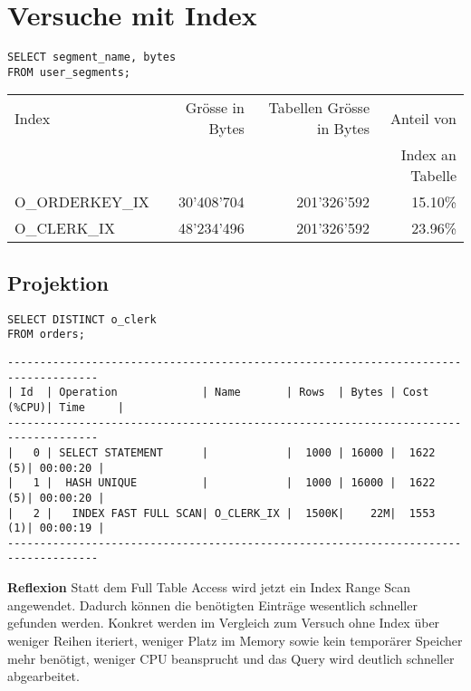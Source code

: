 \documentclass[10pt]{article}
\begin{document}
\section{Versuche mit Index}
\begin{lstlisting}[style=sql]
SELECT segment_name, bytes
FROM user_segments;
\end{lstlisting}


\begin{tabular}{l||r|r|r}
  Index & Grösse in Bytes & Tabellen Grösse in Bytes & Anteil von \\ 
  & & &  Index an Tabelle \\ \hline
  \hline
  O\_ORDERKEY\_IX & 30'408'704 & 201'326'592 & 15.10\%  \\ \hline
  O\_CLERK\_IX & 48'234'496 & 201'326'592 & 23.96\% \\ 
\end{tabular}

\subsection{Projektion}
\begin{lstlisting}[style=sql]
SELECT DISTINCT o_clerk
FROM orders;
\end{lstlisting}
\begin{lstlisting}[style=queryexecutionplan]
------------------------------------------------------------------------------------
| Id  | Operation             | Name       | Rows  | Bytes | Cost (%CPU)| Time     |
------------------------------------------------------------------------------------
|   0 | SELECT STATEMENT      |            |  1000 | 16000 |  1622   (5)| 00:00:20 |
|   1 |  HASH UNIQUE          |            |  1000 | 16000 |  1622   (5)| 00:00:20 |
|   2 |   INDEX FAST FULL SCAN| O_CLERK_IX |  1500K|    22M|  1553   (1)| 00:00:19 |
------------------------------------------------------------------------------------
\end{lstlisting}
\textbf{Reflexion} \newline
Statt dem Full Table Access wird jetzt ein Index Range Scan angewendet. Dadurch können die benötigten Einträge wesentlich schneller gefunden werden. Konkret werden im Vergleich zum Versuch ohne Index über weniger Reihen iteriert, weniger Platz im Memory sowie kein temporärer Speicher mehr benötigt, weniger CPU beansprucht und das Query wird deutlich schneller abgearbeitet.
\end{document}
